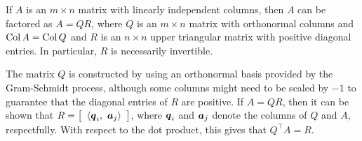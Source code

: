 \begin{Thm} If $A$ is an $m\times n$ matrix with linearly independent columns, then $A$ can be factored as $A =  QR$, where $Q$ is an $m\times n$ matrix with orthonormal columns and $\col A = \col Q$ and $R$ is an $n\times n$ upper triangular matrix with positive diagonal entries. In particular, $R$ is necessarily invertible.
\end{Thm}

The matrix $Q$ is constructed by using an orthonormal basis provided by the Gram-Schmidt process, although some columns might need to be scaled by $-1$ to guarantee that the diagonal entries of $R$ are positive. If $A = QR$, then it can be shown that $R = \mtx{c}{\langle \bb q_i,\ \bb a_j\rangle}$, where $\bb q_i$ and $\bb a_j$ denote the columns of $Q$ and $A$, respectfully. With respect to the dot product, this gives that $Q^\top A = R$. \\

